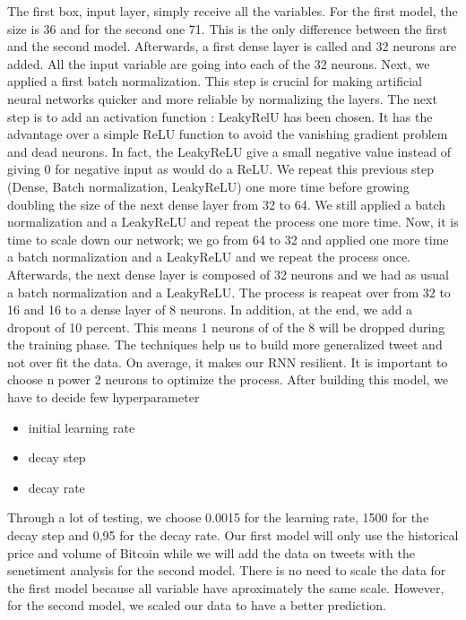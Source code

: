 \documentclass[conference]{IEEEtran}
\begin{document}
The first box, input layer, simply receive all the variables. For the first model, the size is 36 and for the second one 71. This is the only difference between the first and the second model. \newline
\newline
Afterwards, a first dense layer is called and 32 neurons are added. All the input variable are going into each of the 32 neurons. Next, we applied a first batch normalization. This step is crucial for making artificial neural networks quicker and more reliable by normalizing the layers. \newline
\newline
The next step is to add an activation function : LeakyRelU has been chosen. It has the advantage over a simple ReLU function to avoid the vanishing gradient problem and dead neurons. In fact, the LeakyReLU give a small negative value instead of giving 0 for negative input as would do a ReLU.\newline
\newline
We repeat this previous step (Dense, Batch normalization, LeakyReLU) one more time before growing doubling the size of the next dense layer from 32 to 64. We still applied a batch normalization and a LeakyReLU and repeat the process one more time. Now, it is time to scale down our network; we go from 64 to 32 and applied one more time a batch normalization and a LeakyReLU and we repeat the process once. \newline
\newline
Afterwards, the next dense layer is composed of 32 neurons and we had as usual a batch normalization and a LeakyReLU. The process is reapeat over from 32 to 16 and 16 to a dense layer of 8 neurons. In addition, at the end, we add a dropout of 10 percent. This means 1 neurons of of the 8 will be dropped during the training phase. The techniques help us to build more generalized tweet and not over fit the data. On average, it makes our RNN resilient. \newline
\newline
It is important to choose n power 2 neurons to optimize the process. After building this model, we have to decide few hyperparameter \begin{itemize}
        \item initial learning rate 
        \item decay step
        \item decay rate
\end{itemize}
\medskip
Through a lot of testing, we choose 0.0015 for the learning rate, 1500 for the decay step and 0,95 for the decay rate.\newline
\newline
Our first model will only use the historical price and volume of Bitcoin while we will add the data on tweets with the senetiment analysis for the second model. There is no need to scale the data for the first model because all variable have aproximately the same scale. However, for the second model, we scaled our data to have a better prediction. 
\end{document}
